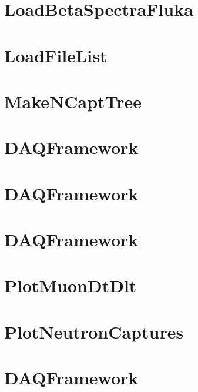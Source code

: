 \let\mypdfximage\pdfximage\def\pdfximage{\immediate\mypdfximage}\documentclass[twoside]{book}
\newcommand{\+}{\discretionary{\mbox{\scriptsize$\hookleftarrow$}}{}{}}
\begin{document}
\chapter{Load\+Beta\+Spectra\+Fluka}
\label{md_UserTools_LoadBetaSpectraFluka_README}

\chapter{Load\+File\+List}
\label{md_UserTools_LoadFileList_README}

\chapter{Make\+NCapt\+Tree}
\label{md_UserTools_MakeNCaptTree_README}

\chapter{DAQFramework}
\label{md_UserTools_NCaptInfo_README}

\chapter{DAQFramework}
\label{md_UserTools_ntag_BDT_README}

\chapter{DAQFramework}
\label{md_UserTools_PlotHitTimes_README}

\chapter{Plot\+Muon\+Dt\+Dlt}
\label{md_UserTools_PlotMuonDtDlt_README}

\chapter{Plot\+Neutron\+Captures}
\label{md_UserTools_PlotNeutronCaptures_README}

\chapter{DAQFramework}
\label{md_UserTools_PrintEvent_README}

\end{document}
